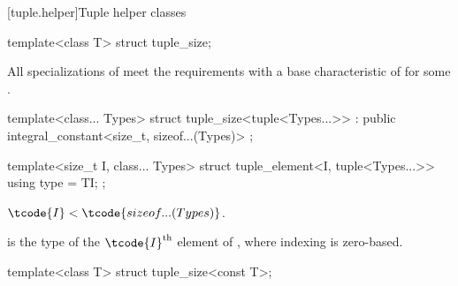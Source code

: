 [tuple.helper]{Tuple helper classes}

%
\begin{itemdecl}
template<class T> struct tuple_size;
\end{itemdecl}

\begin{itemdescr}
\pnum
All specializations of  meet the
 requirements with a
base characteristic of 
for some .
\end{itemdescr}

%
\begin{itemdecl}
template<class... Types>
  struct tuple_size<tuple<Types...>> : public integral_constant<size_t, sizeof...(Types)> { };
\end{itemdecl}

%
\begin{itemdecl}
template<size_t I, class... Types>
  struct tuple_element<I, tuple<Types...>> {
    using type = TI;
  };
\end{itemdecl}

\begin{itemdescr}
\pnum
\mandates
$\tcode{I} < \tcode{sizeof...(Types)}$.

\pnum
\ctype
{} is the
type of the $\tcode{I}^\text{th}$ element of ,
where indexing is zero-based.
\end{itemdescr}

%
\begin{itemdecl}
template<class T> struct tuple_size<const T>;
\end{itemdecl}

